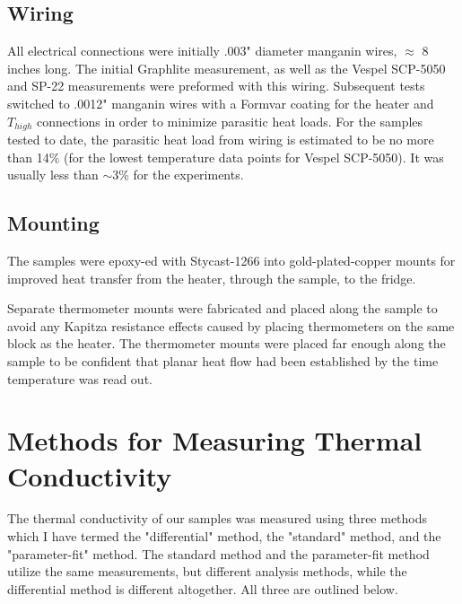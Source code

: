 \documentclass{report}
\begin{document}
\subsection{Wiring}
All electrical connections were initially .003" diameter manganin wires, $\approx$ 8 inches long. The initial Graphlite measurement, as well as the Vespel SCP-5050 and SP-22 measurements were preformed with this wiring. Subsequent tests switched to .0012" manganin wires with a Formvar coating for the heater and $T_{high}$ connections in order to minimize parasitic heat loads. For the samples tested to date, the parasitic heat load from wiring is estimated to be no more than 14\% (for the lowest temperature data points for Vespel SCP-5050). It was usually less than $\sim$3\% for the experiments.

\subsection{Mounting}
The samples were epoxy-ed with Stycast-1266 into gold-plated-copper mounts for improved heat transfer from the heater, through the sample, to the fridge.

Separate thermometer mounts were fabricated and placed along the sample to avoid any Kapitza resistance effects caused by placing thermometers on the same block as the heater. The thermometer mounts were placed far enough along the sample to be confident that planar heat flow had been established by the time temperature was read out.

\section{Methods for Measuring Thermal Conductivity}
The thermal conductivity of our samples was measured using three methods which I have termed the "differential" method, the "standard" method, and the "parameter-fit" method. The standard method and the parameter-fit method utilize the same measurements, but different analysis methods, while the differential method is different altogether. All three are outlined below.
\end{document}
